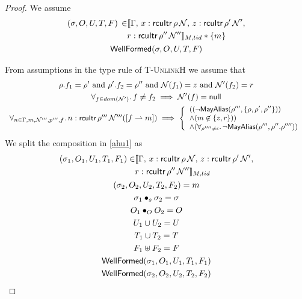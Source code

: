  \begin{proof}
We assume
\begin{gather}\label{ahu1}
  \begin{aligned}
    (\sigma, O, U, T, F) \, \in &  \llbracket \Gamma, \, x:\mathsf{rcuItr}\,\rho\,\mathcal{N} ,\, z:\mathsf{rcuItr} \, \rho' \,\mathcal{N}', \\
    &r:\mathsf{rcuItr} \, \rho'' \,\mathcal{N}'' \rrbracket_{M,tid} * \{m\}
    \end{aligned} \\
\textsf{WellFormed}(\sigma,O,U,T,F)
\label{ahu2}
\end{gather}

From assumptions in the type rule of \textsc{T-UnlinkH} we assume that
\begin{gather}
  \rho.f_1=\rho' \text{ and } \rho'.f_2=\rho'' \text{ and } \N(f_1) = z \text{ and } \N'(f_2)=r
    \label{ahu4} \\
\forall_{f\in dom(\N')} \ldotp f\neq f_2 \implies  \N'(f) = \textsf{null}
      \label{ahu5} \\
\begin{array}{l}\footnotesize
\forall_{n\in \Gamma,m,\N''', p''',f}\ldotp n:\textsf{rcuItr}\,\rho'''\,\N'''([f\rightharpoonup m]) \implies %
\left\{\begin{array}{l}
((\neg\mathsf{MayAlias}(\rho''',\{\rho,\rho',\rho''\})  ) \arcr
\land (m\not\in\{z,r\} ) ) \arcr
\land (\forall_{\rho''''\neq \epsilon} \ldotp \neg\mathsf{MayAlias}(\rho''', \rho''.\rho'''') )
\end{array}\right.
\end{array}
        \label{ahu6}
\end{gather}
We split the composition in  \ref{ahu1} as 
\begin{gather} \label{ahu11}
  \begin{aligned}
    (\sigma_1, O_{1}, U_{1}, T_{1},F_1 ) \in  &\llbracket \Gamma, \, x:\mathsf{rcuItr}\,\rho\,\mathcal{N} ,\, z:\mathsf{rcuItr} \, \rho' \,\mathcal{N}',\\
    &r:\mathsf{rcuItr} \, \rho'' \,\mathcal{N}'' \rrbracket_{M,tid} \end{aligned}\\
\label{ahu12}
(\sigma_2, O_{2}, U_{2}, T_{2},F_2) = m
\\
\label{ahusig}
\sigma_1 \bullet_s \sigma_2 = \sigma \\
\label{ahu13}
O_{1} \bullet_{O} O_{2} = O
\\
\label{ahu14}
U_{1} \cup U_{2} = U
\\
\label{ahu15}
T_{1} \cup T_{2} = T
\\
\label{ahff}
F_{1} \uplus F_2 = F
\\
\label{ahu16}
\textsf{WellFormed}(\sigma_1,O_{1},U_{1},T_{1},F_1)
\\
\label{ahu17}
\textsf{WellFormed}(\sigma_2,O_{2},U_{2},T_{2},F_2)
\end{gather}


\end{proof}
